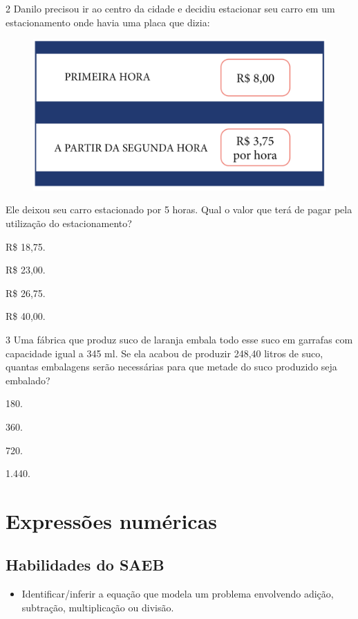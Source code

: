 \num{2} Danilo precisou ir ao centro da cidade e decidiu estacionar seu
carro em um estacionamento onde havia uma placa que dizia:

\begin{figure}[htpb!]
\centering
\includegraphics[width=.5\textwidth]{../ilustracoes/MAT5/SAEB_5ANO_MAT_figura89.png}
\end{figure}

Ele deixou seu carro estacionado por 5 horas. Qual o valor que terá de pagar pela utilização do estacionamento?

\begin{escolha}
\item
  R\$ 18,75.
\item
  R\$ 23,00.
\item
  R\$ 26,75.
\item
  R\$ 40,00.
\end{escolha}


\num{3} Uma fábrica que produz suco de laranja embala todo esse suco em
garrafas com capacidade igual a 345 ml. Se ela acabou de produzir 248,40
litros de suco, quantas embalagens serão necessárias para que metade do
suco produzido seja embalado?

\begin{escolha}
\item
  180.
\item
  360.
\item
  720.
\item
  1.440.
\end{escolha}


\chapter{Expressões numéricas}

\section*{Habilidades do SAEB}

\begin{itemize}
\item Identificar/inferir a equação que modela um problema envolvendo
adição, subtração, multiplicação ou divisão.
\end{itemize}

